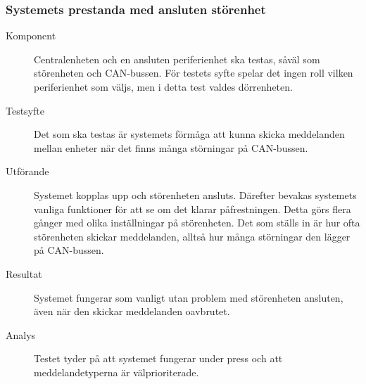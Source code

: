 \documentclass[a4paper]{article}
\begin{document}
\subsubsection{Systemets prestanda med ansluten störenhet}
\label{A:störenhet}
\begin{description}
\item[Komponent] Centralenheten och en ansluten periferienhet ska testas, såväl som störenheten och CAN-bussen.
För testets syfte spelar det ingen roll vilken periferienhet som väljs, men i detta test valdes dörrenheten.

\item[Testsyfte] Det som ska testas är systemets förmåga att kunna skicka meddelanden mellan enheter när det finns många störningar på CAN-bussen.

\item[Utförande] Systemet kopplas upp och störenheten ansluts.
Därefter bevakas systemets vanliga funktioner för att se om det klarar påfrestningen.
Detta görs flera gånger med olika inställningar på störenheten.
Det som ställs in är hur ofta störenheten skickar meddelanden, alltså hur många störningar den lägger på CAN-bussen.

\item[Resultat] Systemet fungerar som vanligt utan problem med störenheten ansluten, även när den skickar meddelanden oavbrutet.

\item[Analys] Testet tyder på att systemet fungerar under press och att meddelandetyperna är välprioriterade.
\end{description}
\end{document}
